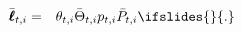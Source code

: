 \begin{eqnarray*}
      \bar{\pmb{\ell}}_{t,i} & = & \theta_{t,i}\bar{\Theta}_{t,i}{p}_{t,i}\bar{{P}}_{t,i} \label{eq:ellSticky}
\ifslides{}{.}
\end{eqnarray*}
